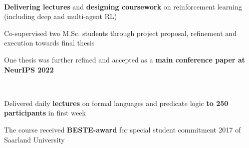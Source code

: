 \documentclass[]{lukas-cv-openfont}
\begin{document}

\noindent
{}
\\
\begin{tightitemize}{1.7em}
    \item \textbf{Delivering lectures} and \textbf{designing coursework} on reinforcement learning (including deep and multi-agent RL)
\end{tightitemize}
\largesectionsep

\begin{tightitemize}{1.7em}
    \item Co-supervised two M.Sc. students through project proposal, refinement and execution towards final thesis
    \item One thesis was further refined and accepted as a \textbf{main conference paper at NeurIPS 2022}
\end{tightitemize}
\largesectionsep

\noindent
{}
\\
\begin{tightitemize}{1.7em}
    \item Delivered daily \textbf{lectures} on formal languages and predicate logic \textbf{to 250 participants} in first week
    \item The course received \textbf{BESTE-award} for special student commitment 2017 of Saarland University
\end{tightitemize}
\largesectionsep

\noindent
{}
\\
\tinysectionsep
\end{document}

